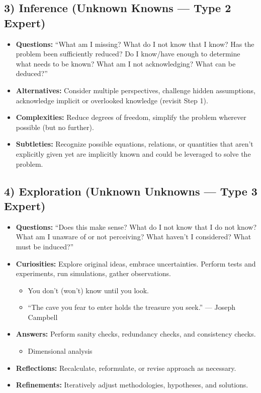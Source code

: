 \documentclass[
  letterpaper,
  DIV=11,
  numbers=noendperiod]{scrartcl}
\providecommand{\tightlist}{%
  \setlength{\itemsep}{0pt}\setlength{\parskip}{0pt}}
\begin{document}
\subsection{3) Inference (Unknown Knowns --- Type 2
Expert)}\label{inference-unknown-knowns-type-2-expert}

\begin{itemize}
\tightlist
\item
  \textbf{Questions:} ``What am I missing? What do I not know that I
  know? Has the problem been sufficiently reduced? Do I know/have enough
  to determine what needs to be known? What am I not acknowledging? What
  can be deduced?''
\item
  \textbf{Alternatives:} Consider multiple perspectives, challenge
  hidden assumptions, acknowledge implicit or overlooked knowledge
  (revisit Step 1).
\item
  \textbf{Complexities:} Reduce degrees of freedom, simplify the problem
  wherever possible (but no further).
\item
  \textbf{Subtleties:} Recognize possible equations, relations, or
  quantities that aren't explicitly given yet are implicitly known and
  could be leveraged to solve the problem.
\end{itemize}

\subsection{4) Exploration (Unknown Unknowns --- Type 3
Expert)}\label{exploration-unknown-unknowns-type-3-expert}

\begin{itemize}
\tightlist
\item
  \textbf{Questions:} ``Does this make sense? What do I not know that I
  do not know? What am I unaware of or not perceiving? What haven't I
  considered? What must be induced?''
\item
  \textbf{Curiosities:} Explore original ideas, embrace uncertainties.
  Perform tests and experiments, run simulations, gather observations.

  \begin{itemize}
  \tightlist
  \item
    You don't (won't) know until you look.
  \item
    ``The cave you fear to enter holds the treasure you seek.'' ---
    Joseph Campbell
  \end{itemize}
\item
  \textbf{Answers:} Perform sanity checks, redundancy checks, and
  consistency checks.

  \begin{itemize}
  \tightlist
  \item
    Dimensional analysis
  \end{itemize}
\item
  \textbf{Reflections:} Recalculate, reformulate, or revise approach as
  necessary.
\item
  \textbf{Refinements:} Iteratively adjust methodologies, hypotheses,
  and solutions.
\end{itemize}
\end{document}
